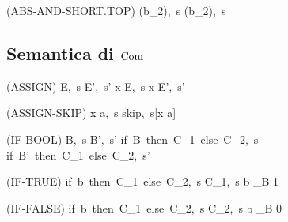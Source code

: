 \begin{center}
	(ABS-AND-SHORT.TOP)
	\prooftree
		\justifies
		\langle (\top \wedge b_2),\ s \rangle \rightarrow \langle (\top \absand b_2),\ s \rangle
	\endprooftree
\end{center}

\subsection{Semantica di $\mathrm{Com}$}

\begin{center}
	(ASSIGN)
	\prooftree
		\langle E,\ s \rangle \rightarrow \langle E',\ s' \rangle
		\justifies
		\langle x \weq E,\ s \rangle \rightarrow \langle x \weq E',\ s' \rangle
	\endprooftree
\end{center}

\begin{center}
	(ASSIGN-SKIP)
	\prooftree
		\justifies
		\langle x \weq a,\ s \rangle \rightarrow \langle skip,\ s[x \mapsto a] \rangle
	\endprooftree
\end{center}

\begin{center}
	(IF-BOOL)
	\prooftree
		\langle B,\ s \rangle \rightarrow \langle B',\ s' \rangle
		\justifies
		\langle if\ B\ then\ C_1\ else\ C_2,\ s \rangle \rightarrow \langle if\ B'\ then\ C_1\ else\ C_2,\ s' \rangle
	\endprooftree
\end{center}

\begin{center}
	(IF-TRUE)
	\prooftree
		\justifies
		\langle if\ b\ then\ C_1\ else\ C_2,\ s \rangle \rightarrow \langle C_1,\ s \rangle
		\using b \sqsubseteq_B 1
	\endprooftree
\end{center}

\begin{center}
	(IF-FALSE)
	\prooftree
		\justifies
		\langle if\ b\ then\ C_1\ else\ C_2,\ s \rangle \rightarrow \langle C_2,\ s \rangle
		\using b \sqsubseteq_B 0
	\endprooftree
\end{center}
